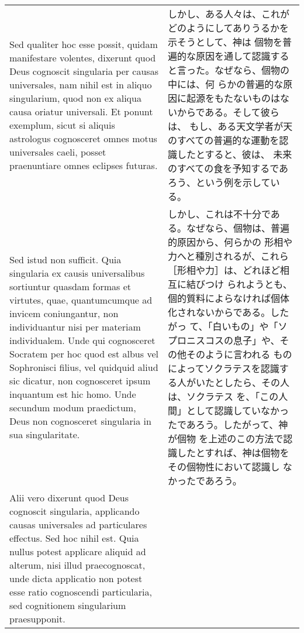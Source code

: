 \documentclass[10pt]{jsarticle} %
\begin{document}
\begin{longtable}{p{21em}p{21em}}
\\



Sed qualiter hoc esse possit, quidam manifestare volentes, dixerunt
quod Deus cognoscit singularia per causas universales, nam nihil est
in aliquo singularium, quod non ex aliqua causa oriatur universali. Et
ponunt exemplum, sicut si aliquis astrologus cognosceret omnes motus
universales caeli, posset praenuntiare omnes eclipses futuras.

&

しかし、ある人々は、これがどのようにしてありうるかを示そうとして、神は
個物を普遍的な原因を通して認識すると言った。なぜなら、個物の中には、何
らかの普遍的な原因に起源をもたないものはないからである。そして彼らは、
もし、ある天文学者が天のすべての普遍的な運動を認識したとすると、彼は、
未来のすべての食を予知するであろう、という例を示している。

\\

Sed istud non sufficit. Quia singularia ex causis universalibus
sortiuntur quasdam formas et virtutes, quae, quantumcumque ad invicem
coniungantur, non individuantur nisi per materiam individualem. Unde
qui cognosceret Socratem per hoc quod est albus vel Sophronisci
filius, vel quidquid aliud sic dicatur, non cognosceret ipsum
inquantum est hic homo. Unde secundum modum praedictum, Deus non
cognosceret singularia in sua singularitate.

&

しかし、これは不十分である。なぜなら、個物は、普遍的原因から、何らかの
形相や力へと種別されるが、これら［形相や力］は、どれほど相互に結びつけ
られようとも、個的質料によらなければ個体化されないからである。したがっ
て、「白いもの」や「ソプロニスコスの息子」や、その他そのように言われる
ものによってソクラテスを認識する人がいたとしたら、その人は、ソクラテス
を、「この人間」として認識していなかったであろう。したがって、神が個物
を上述のこの方法で認識したとすれば、神は個物をその個物性において認識し
なかったであろう。

\\



Alii vero dixerunt quod Deus cognoscit singularia, applicando causas
universales ad particulares effectus. Sed hoc nihil est. Quia nullus
potest applicare aliquid ad alterum, nisi illud praecognoscat, unde
dicta applicatio non potest esse ratio cognoscendi particularia, sed
cognitionem singularium praesupponit.


&


\end{longtable}
\end{document}

